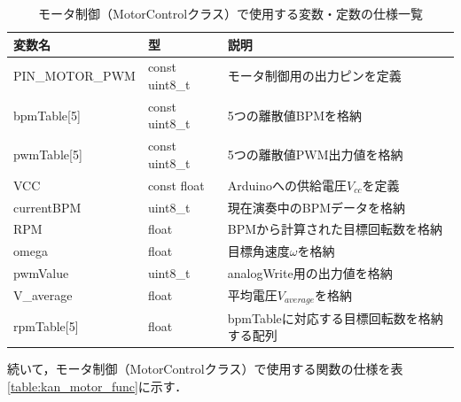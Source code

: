 \begin{table}[H]
    \caption{モータ制御（MotorControlクラス）で使用する変数・定数の仕様一覧}
    \centering
    \label{table:kan_motor_var}
    \begin{tabular}{p{3.9cm}p{3.4cm}p{6.2cm}}
    \hline
    \textbf{変数名} & \textbf{型} & \textbf{説明}\\
    \hline
    PIN\_MOTOR\_PWM & const uint8\_t & モータ制御用の出力ピンを定義\\
    \hline
    bpmTable[5] & const uint8\_t & 5つの離散値BPMを格納\\
    \hline
    pwmTable[5] & const uint8\_t & 5つの離散値PWM出力値を格納\\
    \hline
    VCC & const float & Arduinoへの供給電圧$V_{cc}$を定義\\
    \hline
    currentBPM & uint8\_t & 現在演奏中のBPMデータを格納\\
    \hline
    RPM & float & BPMから計算された目標回転数を格納\\
    \hline
    omega & float & 目標角速度$\omega$を格納\\
    \hline
    pwmValue & uint8\_t & analogWrite用の出力値を格納\\
    \hline
    V\_average & float & 平均電圧$V_{average}$を格納\\
    \hline
    rpmTable[5] & float & bpmTableに対応する目標回転数を格納する配列\\
    \hline
    \end{tabular}
\end{table}

続いて，モータ制御（MotorControlクラス）で使用する関数の仕様を表\ref{table:kan_motor_func}に示す．

